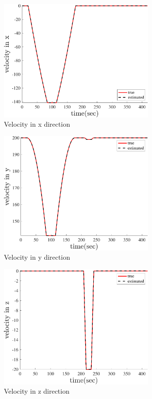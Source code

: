     \begin{figure}[H]
        \centering
        \includegraphics[width=0.7\textwidth]{../Figure/Q5/velocity_x_q}
        \caption{Velocity in x direction}
    \end{figure}
    \begin{figure}[H]
        \centering
        \includegraphics[width=0.7\textwidth]{../Figure/Q5/velocity_y_q}
        \caption{Velocity in y direction}
    \end{figure}
    \begin{figure}[H]
        \centering
        \includegraphics[width=0.7\textwidth]{../Figure/Q5/velocity_z_q}
        \caption{Velocity in z direction}
    \end{figure}
    
